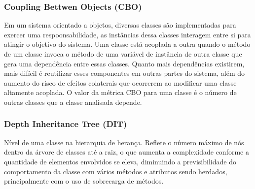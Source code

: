 \documentclass[conference]{IEEEtran}
\begin{document}
\subsubsection{\textbf{Coupling Bettwen Objects (CBO)}} Em um sistema orientado
a objetos, diversas classes são implementadas para exercer uma respoonsabilidade, as
instâncias dessa classes interagem entre si para atingir o objetivo do sistema.
Uma classe está acoplada a outra quando o método de um classe invoca o método de
uma variável de instância de outra classe que gera uma dependência entre essas
classes. Quanto mais dependências existirem, mais difícil é reutilizar esses
componentes em outras partes do sistema, além do aumento do risco de efeitos
colaterais que ocorrerem ao modificar uma classe altamente acoplada. O valor da
métrica CBO para uma classe é o número de outras classes que a classe analisada
depende.

%
%	



\subsubsection{\textbf{Depth Inheritance Tree (DIT)}}  Nível de uma classe na
hierarquia de herança. Reflete o número máximo de nós  dentro da árvore
de classes até a raiz, o que aumenta a complexidade conforme a quantidade de
elementos envolvidos se eleva, diminuindo a previsibilidade do comportamento da
classe com vários métodos e atributos sendo herdados, principalmente com o uso
de sobrecarga de métodos.

\end{document}
